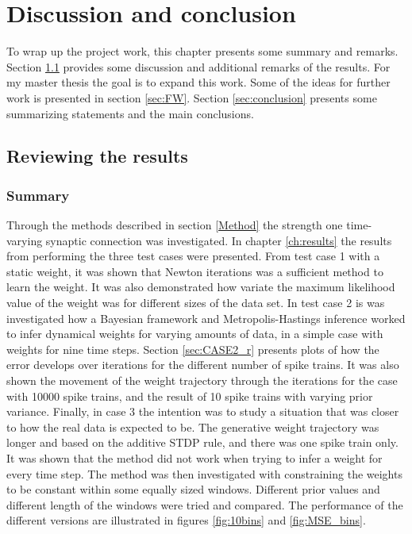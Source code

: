 
\chapter{Discussion and conclusion}
\label{ch:6}

To wrap up the project work, this chapter presents some summary and remarks. Section \ref{sec:review} provides some discussion and additional remarks of the results. For my master thesis the goal is to expand this work. Some of the ideas for further work is presented in section \ref{sec:FW}. Section \ref{sec:conclusion} presents some summarizing statements and the main conclusions.  

\section{Reviewing the results}
\label{sec:review}
\subsection{Summary}
Through the methods described in section \ref{Method} the strength one time-varying synaptic connection was investigated. In chapter \ref{ch:results} the results from performing the three test cases were presented. From test case 1 with a static weight, it was shown that Newton iterations was a sufficient method to learn the weight. It was also demonstrated how variate the maximum likelihood value of the weight was for different sizes of the data set. In test case 2 is was investigated how a Bayesian framework and Metropolis-Hastings inference worked to infer dynamical weights for varying amounts of data, in a simple case with weights for nine time steps. Section \ref{sec:CASE2_r} presents plots of how the error develops over iterations for the different number of spike trains. It was also shown the movement of the weight trajectory through the iterations for the case with 10000 spike trains, and the result of 10 spike trains with varying prior variance. Finally, in case 3 the intention was to study a situation that was closer to how the real data is expected to be. The generative weight trajectory was longer and based on the additive STDP rule, and there was one spike train only. It was shown that the method did not work when trying to infer a weight for every time step. The method was then investigated with constraining the weights to be constant within some equally sized windows. Different prior values and different length of the windows were tried and compared. The performance of the different versions are illustrated in figures \ref{fig:10bins} and \ref{fig:MSE_bins}. 

